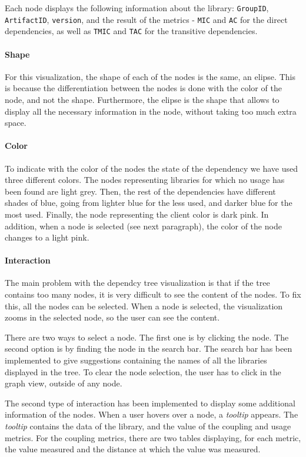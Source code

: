 Each node displays the following information about the library: \texttt{GroupID}, \texttt{ArtifactID}, \texttt{version}, and the result of the metrics - \texttt{MIC} and \texttt{AC} for the direct dependencies, as well as \texttt{TMIC} and \texttt{TAC} for the transitive dependencies.

\paragraph{Shape}
For this visualization, the shape of each of the nodes is the same, an elipse. This is because the differentiation between the nodes is done with the color of the node, and not the shape. Furthermore, the elipse is the shape that allows to display all the necessary information in the node, without taking too much extra space.

\paragraph{Color}
To indicate with the color of the nodes the state of the dependency we have used three different colors. The nodes representing libraries for which no usage has been found are light grey. Then, the rest of the dependencies have different shades of blue, going from lighter blue for the less used, and darker blue for the most used. Finally, the node representing the client color is dark pink. In addition, when a node is selected (see next paragraph), the color of the node changes to a light pink.

\paragraph{Interaction}
The main problem with the dependcy tree visualization is that if the tree contains too many nodes, it is very difficult to see the content of the nodes. To fix this, all the nodes can be selected. When a node is selected, the visualization zooms in the selected node, so the user can see the content.

There are two ways to select a node. The first one is by clicking the node. The second option is by finding the node in the search bar. The search bar has been implemented to give suggestions containing the names of all the libraries displayed in the tree. To clear the node selection, the user has to click in the graph view, outside of any node.

The second type of interaction has been implemented to display some additional information of the nodes. When a user hovers over a node, a \textit{tooltip} appears. The \textit{tooltip} contains the data of the library, and the value of the coupling and usage metrics. For the coupling metrics, there are two tables displaying, for each metric, the value measured and the distance at which the value was measured.

